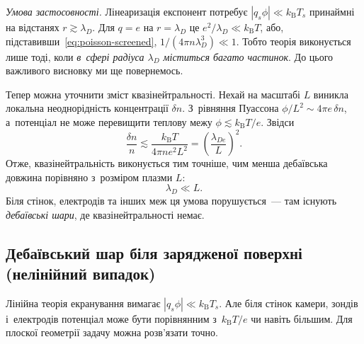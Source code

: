 \emph{Умова застосовності.} Лінеаризація експонент потребує $|q_s\phi|\ll k_{\mathrm
			B}T_s$ принаймні на відстанях $r\gtrsim\lambda_D$. Для $q=e$ на $r=\lambda_D$ це
$e^2/\lambda_D\ll k_{\mathrm B}T$, або, підставивши~\eqref{eq:poisson-screened}, $1/(4\pi
	n\lambda_D^3)\ll1$. Тобто теорія виконується лише тоді, коли \emph{в~сфері радіуса
	$\lambda_D$ міститься багато частинок}. До цього важливого висновку ми ще повернемось.

Тепер можна уточнити зміст квазінейтральності. Нехай на масштабі $L$ виникла локальна
неоднорідність концентрації $\delta n$. З~рівняння Пуассона $\phi/L^2\sim4\pi e\,\delta
	n$, а~потенціал не може перевищити теплову межу $\phi\lesssim k_{\mathrm B}T/e$. Звідси
\begin{equation*}
	\frac{\delta n}n\lesssim\frac{k_{\mathrm B}T}{4\pi ne^2L^2}=\left(\frac{\lambda_{De}}L\right)^2.
\end{equation*}
Отже, квазінейтральність виконується тим точніше, чим менша дебаївська довжина порівняно
з~розміром плазми $L$:
\begin{equation}\label{eq:size-condition}
	\lambda_D\ll L.
\end{equation}
Біля стінок, електродів та інших меж ця умова порушується~--- там існують \emph{дебаївські шари}, де квазінейтральності немає.


\subsection*{Дебаївський шар біля зарядженої поверхні (нелінійний випадок)}\label{sec:debye-layer}


Лінійна теорія екранування вимагає $|q_s\phi|\ll k_{\mathrm B}T_s$. Але біля стінок
камери, зондів і~електродів потенціал може бути порівнянним з~$k_{\mathrm B}T/e$ чи навіть
більшим. Для плоскої геометрії задачу можна розв'язати точно.

